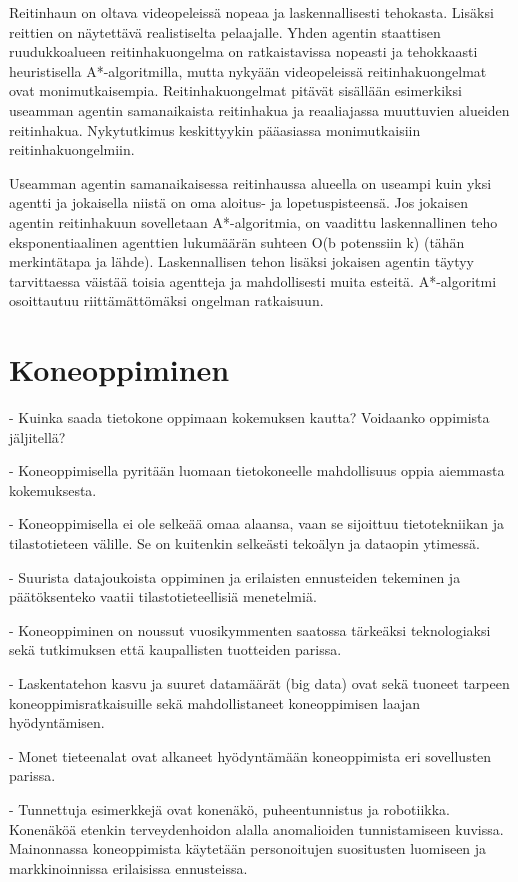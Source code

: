 \documentclass[utf8]{gradu3}
\begin{document}
Reitinhaun on oltava videopeleissä nopeaa ja laskennallisesti tehokasta. Lisäksi reittien on näytettävä realistiselta pelaajalle. Yhden agentin staattisen ruudukkoalueen reitinhakuongelma on ratkaistavissa nopeasti ja tehokkaasti heuristisella A*-algoritmilla, mutta nykyään videopeleissä reitinhakuongelmat ovat monimutkaisempia. Reitinhakuongelmat pitävät sisällään esimerkiksi useamman agentin samanaikaista reitinhakua ja reaaliajassa muuttuvien alueiden reitinhakua. Nykytutkimus keskittyykin pääasiassa monimutkaisiin reitinhakuongelmiin.

Useamman agentin samanaikaisessa reitinhaussa alueella on useampi kuin yksi agentti ja jokaisella niistä on oma aloitus- ja lopetuspisteensä. Jos jokaisen agentin reitinhakuun sovelletaan A*-algoritmia, on vaadittu laskennallinen teho eksponentiaalinen agenttien lukumäärän suhteen O(b potenssiin k) (tähän merkintätapa ja lähde). Laskennallisen tehon lisäksi jokaisen agentin täytyy tarvittaessa väistää toisia agentteja ja mahdollisesti muita esteitä. A*-algoritmi osoittautuu riittämättömäksi ongelman ratkaisuun.

\chapter{Koneoppiminen}

- Kuinka saada tietokone oppimaan kokemuksen kautta? Voidaanko oppimista jäljitellä?

- Koneoppimisella pyritään luomaan tietokoneelle mahdollisuus oppia aiemmasta kokemuksesta.

- Koneoppimisella ei ole selkeää omaa alaansa, vaan se sijoittuu tietotekniikan ja tilastotieteen välille. Se on kuitenkin selkeästi tekoälyn ja dataopin ytimessä.

- Suurista datajoukoista oppiminen ja erilaisten ennusteiden tekeminen ja päätöksenteko vaatii tilastotieteellisiä menetelmiä.

- Koneoppiminen on noussut vuosikymmenten saatossa tärkeäksi teknologiaksi sekä tutkimuksen että kaupallisten tuotteiden parissa.

- Laskentatehon kasvu ja suuret datamäärät (big data) ovat sekä tuoneet tarpeen koneoppimisratkaisuille sekä mahdollistaneet koneoppimisen laajan hyödyntämisen.

- Monet tieteenalat ovat alkaneet hyödyntämään koneoppimista eri sovellusten parissa.

- Tunnettuja esimerkkejä ovat konenäkö, puheentunnistus ja robotiikka. Konenäköä etenkin terveydenhoidon alalla anomalioiden tunnistamiseen kuvissa. Mainonnassa koneoppimista käytetään personoitujen suositusten luomiseen ja markkinoinnissa erilaisissa ennusteissa.
\end{document}
